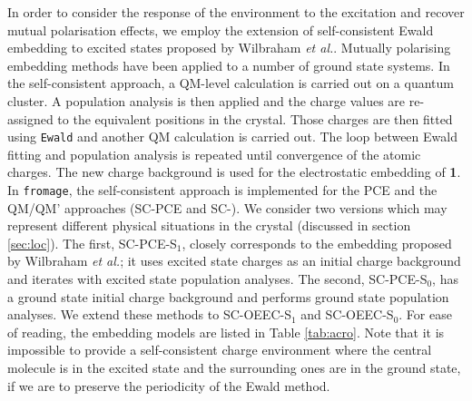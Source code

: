 In order to consider the response of the environment to the excitation and recover mutual polarisation effects, we employ the extension of self-consistent Ewald embedding to excited states proposed by Wilbraham \textit{et al.}\cite{Wilbraham2016a}. Mutually polarising embedding methods have been applied to a number of ground state systems.\cite{Kepenekian2009,Stueber2001,Guennic2007,Weber2010} In the self-consistent approach, a QM-level calculation is carried out on a quantum cluster. A population analysis is then applied and the charge values are re-assigned to the equivalent positions in the crystal. Those charges are then fitted using \texttt{Ewald} and another QM calculation is carried out. The loop between Ewald fitting and population analysis is repeated until convergence of the atomic charges. The new charge background is used for the electrostatic embedding of \textbf{1}. In \texttt{fromage}, the self-consistent approach is implemented for the PCE and the QM/QM' approaches (SC-PCE and SC-\EEC{}). We consider two versions which may represent different physical situations in the crystal (discussed in section \ref{sec:loc}). The first, SC-PCE-S$_1$, closely corresponds to the embedding proposed by Wilbraham \textit{et al.}; it uses excited state charges as an initial charge background and iterates with excited state population analyses. The second, SC-PCE-S$_0$, has a ground state initial charge background and performs ground state population analyses. We extend these methods to SC-OEEC-S$_1$ and SC-OEEC-S$_0$. For ease of reading, the embedding models are listed in Table \ref{tab:acro}. Note that it is impossible to provide a self-consistent charge environment where the central molecule is in the excited state and the surrounding ones are in the ground state, if we are to preserve the periodicity of the Ewald method.

